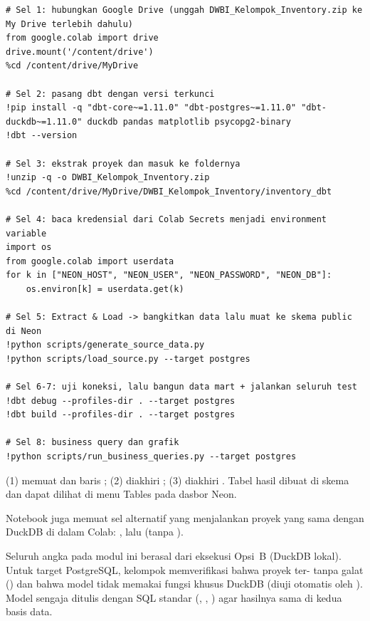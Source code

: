 \begin{lstlisting}[style=py, caption={Isi utama notebook Colab (diringkas dari \kode{inventory\_dbt\_colab.ipynb}).}, label={lst:colab}]
# Sel 1: hubungkan Google Drive (unggah DWBI_Kelompok_Inventory.zip ke My Drive terlebih dahulu)
from google.colab import drive
drive.mount('/content/drive')
%cd /content/drive/MyDrive

# Sel 2: pasang dbt dengan versi terkunci
!pip install -q "dbt-core~=1.11.0" "dbt-postgres~=1.11.0" "dbt-duckdb~=1.11.0" duckdb pandas matplotlib psycopg2-binary
!dbt --version

# Sel 3: ekstrak proyek dan masuk ke foldernya
!unzip -q -o DWBI_Kelompok_Inventory.zip
%cd /content/drive/MyDrive/DWBI_Kelompok_Inventory/inventory_dbt

# Sel 4: baca kredensial dari Colab Secrets menjadi environment variable
import os
from google.colab import userdata
for k in ["NEON_HOST", "NEON_USER", "NEON_PASSWORD", "NEON_DB"]:
    os.environ[k] = userdata.get(k)

# Sel 5: Extract & Load -> bangkitkan data lalu muat ke skema public di Neon
!python scripts/generate_source_data.py
!python scripts/load_source.py --target postgres

# Sel 6-7: uji koneksi, lalu bangun data mart + jalankan seluruh test
!dbt debug --profiles-dir . --target postgres
!dbt build --profiles-dir . --target postgres

# Sel 8: business query dan grafik
!python scripts/run_business_queries.py --target postgres
\end{lstlisting}

\begin{cekberhasil}
(1)  memuat  dan baris ; (2)  diakhiri ; (3)  diakhiri . Tabel hasil dibuat di skema  dan dapat dilihat di menu \textsf{Tables} pada dasbor Neon.
\end{cekberhasil}

\begin{tips}
Notebook juga memuat sel alternatif yang menjalankan proyek yang sama dengan DuckDB di dalam Colab: , lalu  (tanpa ).
\end{tips}

\begin{perhatian}
Seluruh angka pada modul ini berasal dari eksekusi Opsi~B (DuckDB lokal). Untuk target PostgreSQL, kelompok memverifikasi bahwa proyek ter- tanpa galat () dan bahwa model tidak memakai fungsi khusus DuckDB (diuji otomatis oleh ). Model sengaja ditulis dengan SQL standar (, , ) agar hasilnya sama di kedua basis data.
\end{perhatian}

